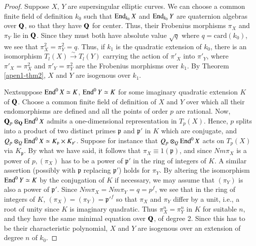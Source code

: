 \begin{proof}
Suppose $X$, $Y$ are supersingular elliptic curves. We can choose a common finite field of definition $k_0$ such that $\operatorname{End}_{k_0}X$ and $\operatorname{End}_{k_0} Y$ are quaternion algebras over $\mathbf{Q}$, so that they have $\mathbf{Q}$ for center. Thus, their Frobenius morphisms $\pi_X$ and $\pi_Y$ lie in $\mathbf{Q}$. Since they must both have absolute value $\surd q$ where $q = \text{card} (k_0)$, we see that $\pi^2_X = \pi^2_Y =q$. Thus, if $k_1$ is the quadratic extension of $k_0$, there is an isomorphism $T_l (X) \xrightarrow{\sim} T_l(Y)$ carrying the action of $\pi'_X$ into $\pi'_Y$, where $\pi'_X = \pi^2_X$ and $\pi'_Y = \pi^2_Y$ are the Frobenius morphisms over $k_1$. By Theorem \ref{apen1-thm2}, $X$ and $Y$ are isogenous over $k_1$.

Next\pageoriginale suppose $\operatorname{End}^0 X \simeq K$, $\operatorname{End}^0 Y \simeq K$ for some imaginary quadratic extension $K$ of $\mathbf{Q}$. Choose a common finite field of definition of $X$ and $Y$ over which all their endomorphisms are defined and all the points of order $p$ are rational. Now, $\mathbf{Q}_p \otimes_{\mathbf{Q}} \operatorname{End}^0 X$ admits a one-dimensional representation in $T_p(X)$. Hence, $p$ splits into a product of two distinct primes $\mathfrak{p}$ and $\mathfrak{p}'$ in $K$ which are conjugate, and $Q_p\otimes_Q \operatorname{End}^0 X\simeq K_{\mathfrak{p}} \times K_{\mathfrak{p}'}$.  Suppose for instance that $Q_p \otimes_Q \operatorname{End}^0 X$ acts on $T_p(X)$ via $K_\mathfrak{p}$. By what we have said, it follows that $\pi_X \equiv 1 (\mathfrak{p})$, and since $Nm\pi_X$ is a power of $p, (\pi_X)$ has to be a power of $\mathfrak{p}'$ in the ring of integers of $K$. A similar assertion (possibly with $\mathfrak{p}$ replacing $\mathfrak{p}'$) holds for $\pi_Y$. By altering the isomorphism $\operatorname{End}^0 Y \simeq K$ by the conjugation of $K$ if necessary, we may assume that $(\pi_Y)$ is also a power of $\mathfrak{p}'$. Since $Nm\pi_X = Nm\pi_Y = q = p^f$, we see that in the ring of integers of $K$, $(\pi_X) = (\pi_Y) =\mathfrak{p}'^f$ so that $\pi_X$ and $\pi_Y$ differ by a unit, i.e., a root of unity since $K$ is imaginary quadratic. Thus $\pi^n_X = \pi^n_Y$ in $K$ for suitable $n$, and they have the same minimal equation over $\mathbf{Q}$, of degree 2. Since this has to be their characteristic polynomial, $X$ and $Y$ are isogenous over an extension of degree $n$ of $k_0$.
\end{proof}

\vfill\eject
~\phantom{a}
\thispagestyle{empty}
